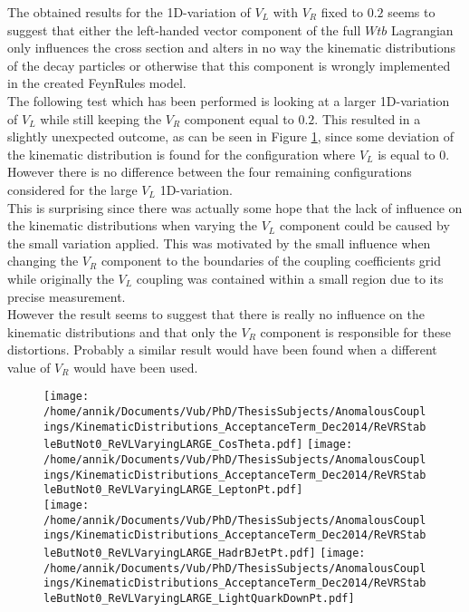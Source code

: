 The obtained results for the 1D-variation of $V_L$ with $V_R$ fixed to $0.2$ seems to suggest that either the left-handed vector component of the full $Wtb$ Lagrangian only influences the cross section and alters in no way the kinematic distributions of the decay particles or otherwise that this component is wrongly implemented in the created FeynRules model. \\
The following test which has been performed is looking at a larger 1D-variation of $V_L$ while still keeping the $V_R$ component equal to $0.2$. This resulted in a slightly unexpected outcome, as can be seen in Figure \ref{fig::KinChangeNot0LARGE}, since some deviation of the kinematic distribution is found for the configuration where $V_L$ is equal to $0$. However there is no difference between the four remaining configurations considered for the large $V_L$ 1D-variation.\\
This is surprising since there was actually some hope that the lack of influence on the kinematic distributions when varying the $V_L$ component could be caused by the small variation applied. This was motivated by the small influence when changing the $V_R$ component to the boundaries of the coupling coefficients grid while originally the $V_L$ coupling was contained within a small region due to its precise measurement.\\
However the result seems to suggest that there is really no influence on the kinematic distributions and that only the $V_R$ component is responsible for these distortions. Probably a similar result would have been found when a different value of $V_R$ would have been used.
\begin{figure}[!h]
 \centering
 \texttt{[image: /home/annik/Documents/Vub/PhD/ThesisSubjects/AnomalousCouplings/KinematicDistributions\_AcceptanceTerm\_Dec2014/ReVRStableButNot0\_ReVLVaryingLARGE\_CosTheta.pdf]}
 \texttt{[image: /home/annik/Documents/Vub/PhD/ThesisSubjects/AnomalousCouplings/KinematicDistributions\_AcceptanceTerm\_Dec2014/ReVRStableButNot0\_ReVLVaryingLARGE\_LeptonPt.pdf]}\\
 \texttt{[image: /home/annik/Documents/Vub/PhD/ThesisSubjects/AnomalousCouplings/KinematicDistributions\_AcceptanceTerm\_Dec2014/ReVRStableButNot0\_ReVLVaryingLARGE\_HadrBJetPt.pdf]}
 \texttt{[image: /home/annik/Documents/Vub/PhD/ThesisSubjects/AnomalousCouplings/KinematicDistributions\_AcceptanceTerm\_Dec2014/ReVRStableButNot0\_ReVLVaryingLARGE\_LightQuarkDownPt.pdf]}
 \caption{}
 \label{fig::KinChangeNot0LARGE}
\end{figure}

